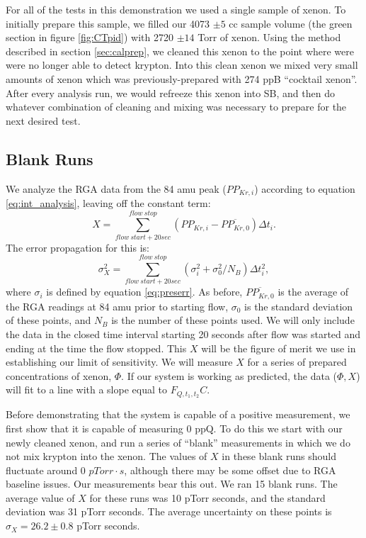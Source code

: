 \documentclass[12pt]{article}
\begin{document}
For all of the tests in this demonstration we used a single sample of xenon. To initially prepare this sample, we filled our 4073 $\pm 5$ cc sample volume (the green section in figure \ref{fig:CTpid}) with 2720 $\pm 14$ Torr of xenon. Using the method described in section \ref{sec:calprep}, we cleaned this xenon to the point where were were no longer able to detect krypton. Into this clean xenon we mixed very small amounts of xenon which was previously-prepared with 274 ppB ``cocktail xenon''. After every analysis run, we would refreeze this xenon into SB, and then do whatever combination of cleaning and mixing was necessary to prepare for the next desired test.

\subsection{Blank Runs}
We analyze the RGA data from the 84 amu peak ($PP_{Kr,i}$) according to equation \ref{eq:int_analysis}, leaving off the constant term:
\begin{equation}
\label{eq:SLACintan}
X=\sum_{flow \  start+20sec}^{flow \ stop}(PP_{Kr,i}-\overline{PP_{Kr,0}})\Delta t_i.
\end{equation}
The error propagation for this is:
\begin{equation}
\sigma_{X}^2=\sum_{flow \  start+20sec}^{flow \ stop}(\sigma_i^2+\sigma_0^2/N_B)\Delta t_i^2,
\end{equation}
where $\sigma_i$ is defined by equation \ref{eq:preserr}. As before, $\overline{PP_{Kr,0}}$ is the average of the RGA readings at 84 amu prior to starting flow, $\sigma_0$ is the standard deviation of these points, and $N_B$ is the number of these points used. We will only include the data in the closed time interval starting 20 seconds after flow was started and ending at the time the flow stopped. This $X$ will be the figure of merit we use in establishing our limit of sensitivity. We will measure $X$ for a series of prepared concentrations of xenon, $\Phi$. If our system is working as predicted, the data ($\Phi,X$) will fit to a line with a slope equal to $F_{Q,t_1,t_2}C$.

Before demonstrating that the system is capable of a positive measurement, we first show that it is capable of measuring 0 ppQ. To do this we start with our newly cleaned xenon, and run a series of ``blank'' measurements in which we do not mix krypton into the xenon. The values of $X$ in these blank runs should fluctuate around 0 $pTorr\cdot s$, although there may be some offset due to RGA baseline issues. Our measurements bear this out. We ran 15 blank runs. The average value of $X$ for these runs was 10 pTorr seconds, and the standard deviation was 31 pTorr seconds. The average uncertainty on these points is $\sigma_X=26.2\pm0.8$ pTorr seconds.
\end{document}
